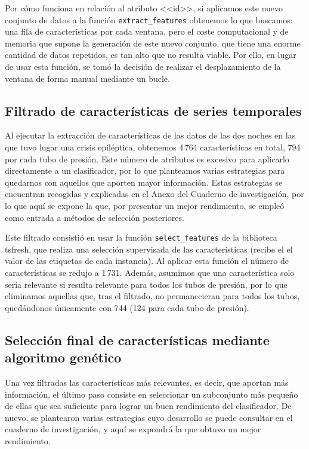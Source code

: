 Por cómo funciona en relación al atributo <<id>>, si aplicamos este nuevo conjunto de datos a la función \texttt{extract\_features} obtenemos lo que buscamos: una fila de características por cada ventana, pero el coste computacional y de memoria que supone la generación de este nuevo conjunto, que tiene una enorme cantidad de datos repetidos, es tan alto que no resulta viable. Por ello, en lugar de usar esta función, se tomó la decisión de realizar el desplazamiento de la ventana de forma manual mediante un bucle.


\subsection{Filtrado de características de series temporales}

Al ejecutar la extracción de características de las datos de las dos noches en las que tuvo lugar una crisis epiléptica, obtenemos 4\,764 características en total, 794 por cada tubo de presión. Este número de atributos es excesivo para aplicarlo directamente a un clasificador, por lo que planteamos varias estrategias para quedarnos con aquellos que aporten mayor información. Estas estrategias se encuentran recogidas y explicadas en el Anexo del Cuaderno de investigación, por lo que aquí se expone la que, por presentar un mejor rendimiento, se empleó como entrada a métodos de selección posteriores. 

Este filtrado consistió en usar la función \texttt{select\_features} de la biblioteca tsfresh, que realiza una selección supervisada de las características (recibe el el valor de las etiquetas de cada instancia). Al aplicar esta función el número de características se redujo a 1\,731. Además, asumimos que una característica solo sería relevante si resulta relevante para todos los tubos de presión, por lo que eliminamos aquellas que, tras el filtrado, no permanecieran para todos los tubos, quedándonos únicamente con 744 (124 para cada tubo de presión).  

\subsection{Selección final de características mediante algoritmo genético}

Una vez filtradas las características más relevantes, es decir, que aportan más información, el último paso consiste en seleccionar un subconjunto más pequeño de ellas que sea suficiente para lograr un buen rendimiento del clasificador. De nuevo, se plantearon varias estrategias cuyo desarrollo se puede consultar en el cuaderno de investigación, y aquí se expondrá la que obtuvo un mejor rendimiento. 

